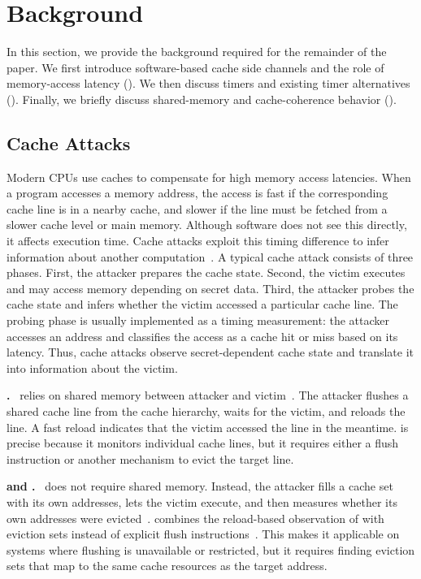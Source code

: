 \documentclass[letterpaper,twocolumn,10pt]{article} %
\newcommand{\paragrabf}[1]{\noindent \textbf{#1.}\ }
\begin{document}
\section{Background}\label{sec:background}
In this section, we provide the background required for the remainder of the paper.
We first introduce software-based cache side channels and the role of memory-access latency ().
We then discuss timers and existing timer alternatives ().
Finally, we briefly discuss shared-memory and cache-coherence behavior ().

\subsection{Cache Attacks}\label{sec:background:cache-attacks}
Modern CPUs use caches to compensate for high memory access latencies.
When a program accesses a memory address, the access is fast if the corresponding cache line is in a nearby cache, and slower if the line must be fetched from a slower cache level or main memory.
Although software does not see this directly, it affects execution time.
Cache attacks exploit this timing difference to infer information about another computation~\cite{Osvik2006,Yarom2014Flush,Gruss2016Flush,Rauscher2025Systematic}.
A typical cache attack consists of three phases.
First, the attacker prepares the cache state.
Second, the victim executes and may access memory depending on secret data.
Third, the attacker probes the cache state and infers whether the victim accessed a particular cache line.
The probing phase is usually implemented as a timing measurement: the attacker accesses an address and classifies the access as a cache hit or miss based on its latency. %
Thus, cache attacks observe secret-dependent cache state and translate it into information about the victim.

\paragrabf{\FlushReload}
\FlushReload relies on shared memory between attacker and victim~\cite{Yarom2014Flush}.
The attacker flushes a shared cache line from the cache hierarchy, waits for the victim, and reloads the line.
A fast reload indicates that the victim accessed the line in the meantime.
\FlushReload is precise because it monitors individual cache lines, but it requires either a flush instruction or another mechanism to evict the target line.

\paragrabf{\PrimeProbe and \EvictReload}
\PrimeProbe does not require shared memory.
Instead, the attacker fills a cache set with its own addresses, lets the victim execute, and then measures whether its own addresses were evicted~\cite{Osvik2006}.
\EvictReload combines the reload-based observation of \FlushReload with eviction sets instead of explicit flush instructions~\cite{Lipp2016}.
This makes it applicable on systems where flushing is unavailable or restricted, but it requires finding eviction sets that map to the same cache resources as the target address.
\end{document}
